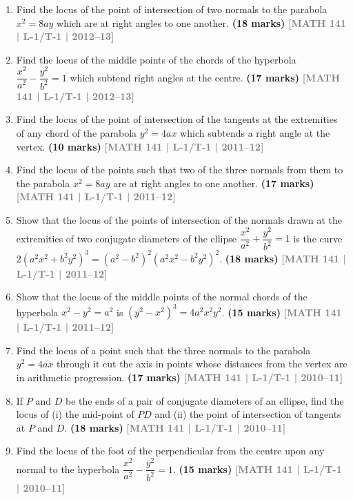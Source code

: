 \documentclass[12pt,a4paper]{article}
\newcommand{\yr}[1]{\hfill\textcolor{gray}{\small\textbf{[#1]}}}
\newcommand{\mk}[1]{\textcolor{orange!70!black}{\small\textbf{(#1 marks)}}}
\begin{document}
\begin{enumerate}
\item Find the locus of the point of intersection of two normals to the parabola $x^{2}=8ay$ which are at right angles to one another.
\mk{18} \yr{MATH 141 | L-1/T-1 | 2012--13}

\item Find the locus of the middle points of the chords of the hyperbola $\dfrac{x^{2}}{a^{2}}-\dfrac{y^{2}}{b^{2}}=1$ which subtend right angles at the centre.
\mk{17} \yr{MATH 141 | L-1/T-1 | 2012--13}

\item Find the locus of the point of intersection of the tangents at the extremities of any chord of the parabola $y^{2}=4ax$ which subtends a right angle at the vertex.
\mk{10} \yr{MATH 141 | L-1/T-1 | 2011--12}

\item Find the locus of the points such that two of the three normals from them to the parabola $x^{2}=8ay$ are at right angles to one another.
\mk{17} \yr{MATH 141 | L-1/T-1 | 2011--12}

\item Show that the locus of the points of intersection of the normals drawn at the extremities of two conjugate diameters of the ellipse $\dfrac{x^{2}}{a^{2}}+\dfrac{y^{2}}{b^{2}}=1$ is the curve $2(a^{2}x^{2}+b^{2}y^{2})^{3}=(a^{2}-b^{2})^{2}(a^{2}x^{2}-b^{2}y^{2})^{2}$.
\mk{18} \yr{MATH 141 | L-1/T-1 | 2011--12}

\item Show that the locus of the middle points of the normal chords of the hyperbola $x^{2}-y^{2}=a^{2}$ is $(y^{2}-x^{2})^{3}=4a^{2}x^{2}y^{2}$.
\mk{15} \yr{MATH 141 | L-1/T-1 | 2011--12}

\item Find the locus of a point such that the three normals to the parabola $y^{2}=4ax$ through it cut the axis in points whose distances from the vertex are in arithmetic progression.
\mk{17} \yr{MATH 141 | L-1/T-1 | 2010--11}

\item If $P$ and $D$ be the ends of a pair of conjugate diameters of an ellipse, find the locus of (i) the mid-point of $PD$ and (ii) the point of intersection of tangents at $P$ and $D$.
\mk{18} \yr{MATH 141 | L-1/T-1 | 2010--11}

\item Find the locus of the foot of the perpendicular from the centre upon any normal to the hyperbola $\dfrac{x^{2}}{a^{2}}-\dfrac{y^{2}}{b^{2}}=1$.
\mk{15} \yr{MATH 141 | L-1/T-1 | 2010--11}


\end{enumerate}
\end{document}
